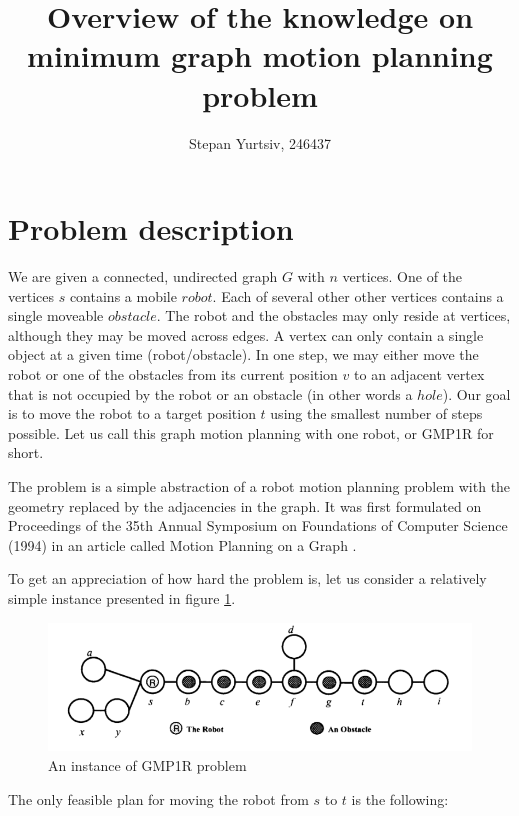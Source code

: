 \documentclass[12pt, a4paper]{article}
\title{Overview of the knowledge on minimum graph motion planning problem}
\author{Stepan Yurtsiv, 246437}
\theoremstyle{definition}
\begin{document}
\maketitle

\section*{Problem description}

We are given a connected, undirected graph $G$ with $n$ vertices. One of the vertices $s$ contains a mobile $robot$.
Each of several other other vertices contains a single moveable $obstacle$. The robot and the obstacles may only reside at vertices, although they may be moved across edges.
A vertex can only contain a single object at a given time (robot/obstacle).
In one step, we may either move the robot or one of the obstacles from its current position $v$ to an adjacent vertex that is not occupied by the robot or an obstacle (in other words a $hole$).
Our goal is to move the robot to a target position $t$ using the smallest number of steps possible.  Let us call this graph motion planning with one robot, or GMP1R for short.

The problem is a simple abstraction of a robot motion planning problem with the geometry replaced by the adjacencies in the graph.
It was first formulated on Proceedings of the 35th Annual Symposium on Foundations of Computer Science (1994) in an article called Motion Planning on a Graph \cite{365740}.

To get an appreciation of how hard the problem is, let us consider a relatively simple instance presented in figure \ref{problem_instance}.

\begin{figure}[H]
  \begin{center}
  \includegraphics[scale=0.5]{Problem_instance}
  \caption{An instance of GMP1R problem \cite{365740}}
  \label{problem_instance}
  \end{center}
\end{figure}

\noindent
The only feasible plan for moving the robot from $s$ to $t$ is the following:
\end{document}
